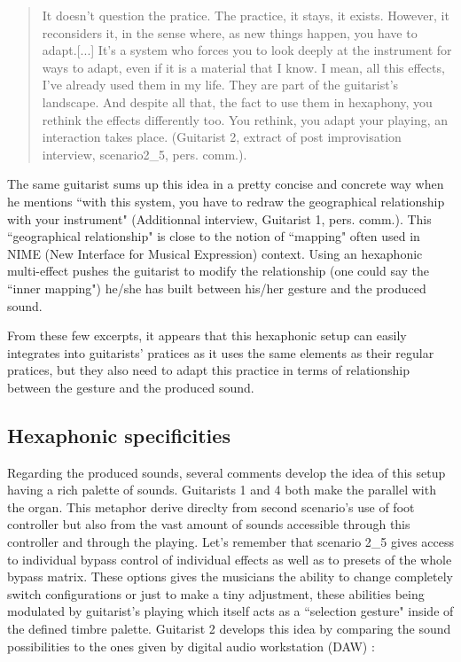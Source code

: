 \documentclass{article}
\begin{document}
    \begin{quote}
     It doesn't question the pratice. The practice, it stays, it exists. However, it reconsiders it, in the sense where, as new things happen, you have to adapt.[...] It's a system who forces you to look deeply at the instrument for ways to adapt, even if it is a material that I know. I mean, all this effects, I've already used them in my life. They are part of the guitarist's landscape. And despite all that, the fact to use them in hexaphony, you rethink the effects differently too. You rethink, you adapt your playing, an interaction takes place. (Guitarist 2, extract of post improvisation interview, scenario2\_5, pers. comm.).
    \end{quote}

The same guitarist sums up this idea in a pretty concise and concrete way when he mentions ``with this system, you have to redraw the geographical relationship with your instrument" (Additionnal interview, Guitarist 1, pers. comm.). This ``geographical relationship" is close to the notion of ``mapping" often used in NIME (New Interface for Musical Expression) context. Using an hexaphonic multi-effect pushes the guitarist to modify the relationship (one could say the ``inner mapping") he/she has built between his/her gesture and the produced sound. 

From these few excerpts, it appears that this hexaphonic setup can easily integrates into guitarists' pratices as it uses the same elements as their regular pratices, but they also need to adapt this practice in terms of relationship between the gesture and the produced sound.




\subsection{Hexaphonic specificities}

Regarding the produced sounds, several comments develop the idea of this setup having a rich palette of sounds. Guitarists 1 and 4 both make the parallel with the organ. This metaphor derive direclty from second scenario's use of foot controller but also from the vast amount of sounds accessible through this controller  and through the playing.  Let's remember that scenario 2\_5 gives access to individual bypass control of individual effects as well as to presets of the whole bypass matrix. These options gives the musicians the ability to change completely switch configurations or just to make a tiny adjustment, these abilities being modulated by guitarist's playing which itself acts as a ``selection gesture" \cite{sci:Cadoz94} inside of the defined timbre palette.
Guitarist 2 develops this idea by comparing the sound possibilities to the ones given by digital audio workstation (DAW) : 
\end{document}
